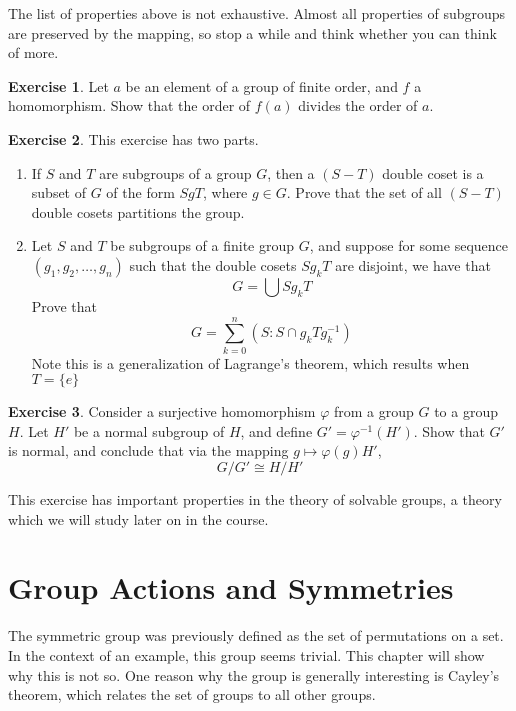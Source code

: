 \documentclass[12pt]{amsbook}
\theoremstyle{definition}
\newtheorem{exercise}{Exercise}[chapter]
\begin{document}
The list of properties above is not exhaustive. Almost all properties of subgroups are preserved by the mapping, so stop a while and think whether you can think of more.

\clearpage

\begin{exercise}
    Let $a$ be an element of a group of finite order, and $f$ a homomorphism. Show that the order of $f(a)$ divides the order of $a$.
\end{exercise}

\begin{exercise}
    This exercise has two parts.

    \begin{enumerate}
        \item If $S$ and $T$ are subgroups of a group $G$, then a $(S - T)$ double coset is a subset of $G$ of the form $SgT$, where $g \in G$. Prove that the set of all $(S - T)$ double cosets partitions the group.
        \item Let $S$ and $T$ be subgroups of a finite group $G$, and suppose for some sequence $(g_1, g_2, \dots, g_n)$ such that the double cosets $Sg_kT$ are disjoint, we have that
        \[ G = \bigcup Sg_kT \]
        Prove that
        \[ G = \sum_{k = 0}^n (S:S \cap g_kTg_k^{-1}) \]
        Note this is a generalization of Lagrange's theorem, which results when $T = \{ e \}$
    \end{enumerate}
\end{exercise}

\begin{exercise}
    Consider a surjective homomorphism $\varphi$ from a group $G$ to a group $H$. Let $H'$ be a normal subgroup of $H$, and define $G' = \varphi^{-1}(H')$. Show that $G'$ is normal, and conclude that via the mapping $g \mapsto \varphi(g)H'$,
    \[ G/G' \cong H/H' \]
\end{exercise}

This exercise has important properties in the theory of solvable groups, a theory which we will study later on in the course.





\chapter{Group Actions and Symmetries}

The symmetric group was previously defined as the set of permutations on a set. In the context of an example, this group seems trivial. This chapter will show why this is not so. One reason why the group is generally interesting is Cayley's theorem, which relates the set of groups to all other groups.
\end{document}
